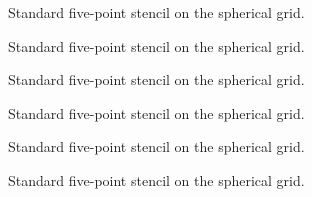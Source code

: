 \documentclass[11pt]{article}
\begin{document}
\begin{figure}[htbp]
	\centering
	
	\caption{Standard five-point stencil on the spherical grid.}
\end{figure}

\begin{figure}[htbp]
	\centering
	
	\caption{Standard five-point stencil on the spherical grid.}
\end{figure}


\begin{figure}[htbp]
	\centering
	
	\caption{Standard five-point stencil on the spherical grid.}
\end{figure}

\begin{figure}[htbp]
	\centering
	
	\caption{Standard five-point stencil on the spherical grid.}
\end{figure}

\begin{figure}[htbp]
	\centering
	
	\caption{Standard five-point stencil on the spherical grid.}
\end{figure}

\begin{figure}[htbp]
	\centering
	
	\caption{Standard five-point stencil on the spherical grid.}
\end{figure}
\end{document}
